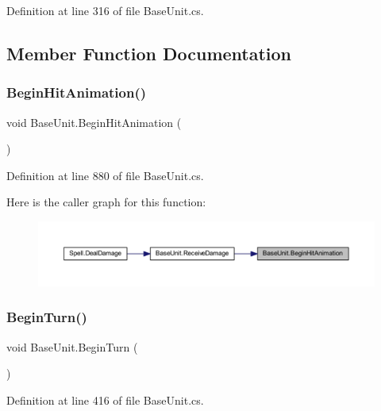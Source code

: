 Definition at line 316 of file Base\+Unit.\+cs.



\subsection{Member Function Documentation}
\mbox{\label{class_base_unit_a01c63c5cd0d41b5ca787470fd0c19472}} 
\subsubsection{\texorpdfstring{BeginHitAnimation()}{BeginHitAnimation()}}
{\footnotesize\ttfamily void Base\+Unit.\+Begin\+Hit\+Animation (\begin{DoxyParamCaption}{ }\end{DoxyParamCaption})}



Definition at line 880 of file Base\+Unit.\+cs.

Here is the caller graph for this function\+:
\nopagebreak
\begin{figure}[H]
\begin{center}
\leavevmode
\includegraphics[width=350pt]{class_base_unit_a01c63c5cd0d41b5ca787470fd0c19472_icgraph}
\end{center}
\end{figure}
\mbox{\label{class_base_unit_a0f8955c72dfa02027c1b247d74233f0d}} 
\subsubsection{\texorpdfstring{BeginTurn()}{BeginTurn()}}
{\footnotesize\ttfamily void Base\+Unit.\+Begin\+Turn (\begin{DoxyParamCaption}{ }\end{DoxyParamCaption})}



Definition at line 416 of file Base\+Unit.\+cs.

